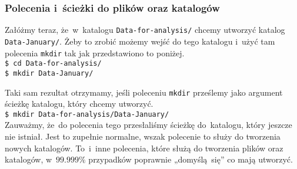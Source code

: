 \documentclass[10pt,t]{beamer}
\begin{document}
\begin{frame}
  \frametitle{Polecenia i~ścieżki do plików oraz katalogów}


  Załóżmy teraz, że~w~katalogu \texttt{Data-for-analysis/} chcemy utworzyć
  katalog \texttt{Data-January/}. Żeby to zrobić możemy wejść do tego
  katalogu i~użyć tam polecenia \texttt{mkdir} tak jak przedstawiono to
  poniżej. \\
  \texttt{\$ cd Data-for-analysis/} \\
  \texttt{\$ mkdir Data-January/}

  Taki sam rezultat otrzymamy, jeśli poleceniu \texttt{mkdir} prześlemy jako
  argument ścieżkę katalogu, który chcemy utworzyć. \\
  \texttt{\$ mkdir Data-for-analysis/Data-January/} \\
  Zauważmy, że~do polecenia tego przesłaliśmy ścieżkę do~katalogu,
  który \alert{jeszcze} nie istniał. Jest to zupełnie normalne, wszak
  polecenie to służy do tworzenia nowych katalogów. To~i~inne polecenia,
  które służą do tworzenia plików oraz katalogów, w~$99.999\%$ przypadków
  poprawnie „domyślą~się” co mają utworzyć.

\end{frame}
\end{document}
